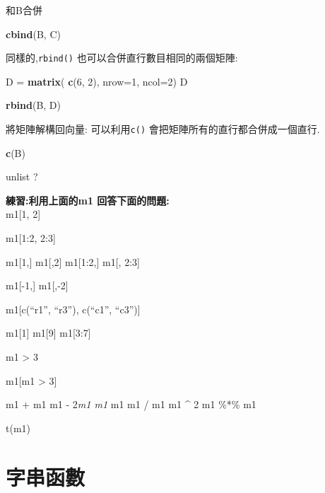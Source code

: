 \documentclass[]{book}
\newenvironment{Shaded}{\begin{snugshade}}{\end{snugshade}}
\newcommand{\KeywordTok}[1]{\textcolor[rgb]{0.13,0.29,0.53}{\textbf{#1}}}
\newcommand{\DataTypeTok}[1]{\textcolor[rgb]{0.13,0.29,0.53}{#1}}
\newcommand{\DecValTok}[1]{\textcolor[rgb]{0.00,0.00,0.81}{#1}}
\newcommand{\StringTok}[1]{\textcolor[rgb]{0.31,0.60,0.02}{#1}}
\newcommand{\NormalTok}[1]{#1}
\theoremstyle{definition}
\theoremstyle{definition}
\theoremstyle{definition}
\theoremstyle{remark}
\begin{document}
和B合併

\begin{Shaded}
\begin{Highlighting}[]
\KeywordTok{cbind}\NormalTok{(B, C) }
\end{Highlighting}
\end{Shaded}

同樣的,\texttt{rbind()} 也可以合併直行數目相同的兩個矩陣:

\begin{Shaded}
\begin{Highlighting}[]
\NormalTok{ D =}\StringTok{ }\KeywordTok{matrix}\NormalTok{( }
   \KeywordTok{c}\NormalTok{(}\DecValTok{6}\NormalTok{, }\DecValTok{2}\NormalTok{), }
   \DataTypeTok{nrow=}\DecValTok{1}\NormalTok{, }
   \DataTypeTok{ncol=}\DecValTok{2}\NormalTok{) }
\NormalTok{D}
\end{Highlighting}
\end{Shaded}

\begin{Shaded}
\begin{Highlighting}[]
\KeywordTok{rbind}\NormalTok{(B, D) }
\end{Highlighting}
\end{Shaded}

將矩陣解構回向量: 可以利用\texttt{c()}
會把矩陣所有的直行都合併成一個直行.

\begin{Shaded}
\begin{Highlighting}[]
\KeywordTok{c}\NormalTok{(B) }
\end{Highlighting}
\end{Shaded}

unlist ?

\textbf{練習:利用上面的m1 回答下面的問題:}\\
m1{[}1, 2{]}

m1{[}1:2, 2:3{]}

m1{[}1,{]} m1{[},2{]} m1{[}1:2,{]} m1{[}, 2:3{]}

m1{[}-1,{]} m1{[},-2{]}

m1{[}c(``r1'', ``r3''), c(``c1'', ``c3''){]}

m1{[}1{]} m1{[}9{]} m1{[}3:7{]}

m1 \textgreater{} 3

m1{[}m1 \textgreater{} 3{]}

m1 + m1 m1 - 2\emph{m1 m1 } m1 m1 / m1 m1 \^{} 2 m1 \%*\% m1

t(m1)

\section{字串函數}
\end{document}
